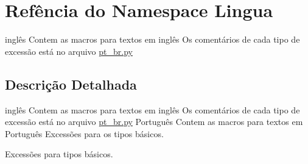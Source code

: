 \hypertarget{namespaceLingua}{\section{Refência do Namespace Lingua}
\label{namespaceLingua}
}


inglês Contem as macros para textos em inglês Os comentários de cada tipo de excessão está no arquivo \hyperlink{pt__br_8py}{pt\-\_\-br.\-py}  




\subsection{Descrição Detalhada}
inglês Contem as macros para textos em inglês Os comentários de cada tipo de excessão está no arquivo \hyperlink{pt__br_8py}{pt\-\_\-br.\-py} Português Contem as macros para textos em Português Excessões para os tipos básicos.

Excessões para tipos básicos. 